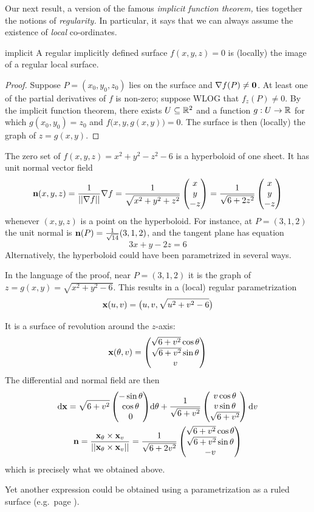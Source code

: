 Our next result, a version of the famous \emph{implicit function theorem,} ties together the notions of \emph{regularity.} In particular, it says that we can always assume the existence of \emph{local} co-ordinates.

\begin{thm}{}{implicit}
A regular implicitly defined surface $f(x,y,z)=0$ is (locally) the image of a regular local surface.
\end{thm}

\begin{proof}
Suppose $P=(x_0,y_0,z_0)$ lies on the surface and $\nabla f(P)\neq\mathbf{0}$. At least one of the partial derivatives of $f$ is non-zero; suppose WLOG that $f_z(P)\neq 0$. By the implicit function theorem, there exists $U\subseteq\mathbb{R}^2$ and a function $g:U\to\mathbb{R}$ for which $g(x_0,y_0)=z_0$ and $f\big(x,y,g(x,y)\big)=0$. The surface is then (locally) the graph of $z=g(x,y)$.%
\end{proof}


\begin{example}{}{}
The zero set of $f(x,y,z)=x^2+y^2-z^2-6$ is a hyperboloid of one sheet. It has unit normal vector field
\[{\mathbf{n}}(x,y,z)=\frac 1{\left| \left| \nabla f\right|\right|}\nabla f=\frac{1}{\sqrt{x^2+y^2+z^2}}\begin{pmatrix}x\\y\\-z\end{pmatrix} =\frac{1}{\sqrt{6+2z^2}}\begin{pmatrix}x\\y\\-z\end{pmatrix}\]
whenever $(x,y,z)$ is a point on the hyperboloid. For instance, at $P=(3,1,2)$ the unit normal is ${\mathbf{n}}(P)=\frac{1}{\sqrt{14}}(3,1,2)$, and the tangent plane has equation
\[3x+y-2z=6\]
Alternatively, the hyperboloid could have been parametrized in several ways.
\begin{enumeratea}
	\item In the language of the proof, near $P=(3,1,2)$ it is the graph of $z=g(x,y)=\sqrt{x^2+y^2-6}$. This results in a (local) regular parametrization
	\[{\mathbf{x}}(u,v)=\bigl(u,v,\sqrt{u^2+v^2-6}\bigr)\]
	\item It is a surface of revolution around the $z$-axis:
	\[{\mathbf{x}}(\theta,v)=\begin{pmatrix}\sqrt{6+v^2}\cos\theta\\\sqrt{6+v^2}\sin\theta\\v\end{pmatrix}\]
	The differential and normal field are then
	\begin{gather*}
	\mathrm{d}{\mathbf{x}}=\sqrt{6+v^2}\begin{pmatrix}-\sin\theta\\\cos\theta\\0\end{pmatrix}\!{\mathrm{d}\theta} +\frac 1{\sqrt{6+v^2}}\begin{pmatrix}v\cos\theta\\v\sin\theta\\\sqrt{6+v^2}\end{pmatrix}{\mathrm{d}v}\\
	{\mathbf{n}}=\frac{{\mathbf{x}}_\theta\times{\mathbf{x}}_v}{\left| \left| {\mathbf{x}}_\theta\times{\mathbf{x}}_v\right|\right|} =\frac 1{\sqrt{6+2v^2}} \begin{pmatrix}\sqrt{6+v^2}\cos\theta\\\sqrt{6+v^2}\sin\theta\\-v\end{pmatrix}
	\end{gather*}
 	which is precisely what we obtained above.
\end{enumeratea}
Yet another expression could be obtained using a parametrization as a ruled surface (e.g.\ page \pageref{page:hyperrule}).
\end{example}




